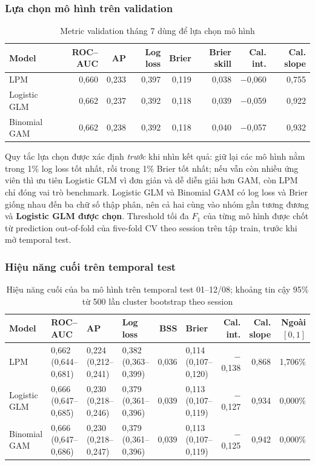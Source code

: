 \subsubsection{Lựa chọn mô hình trên validation}

\begin{table}[H]
\centering
\caption{Metric validation tháng 7 dùng để lựa chọn mô hình}
\label{tab:validation}
\small
\begin{tabular}{lrrrrrrr}
\toprule
\textbf{Model} & \textbf{ROC--AUC} & \textbf{AP} & \textbf{Log loss}
& \textbf{Brier} & \textbf{Brier skill} & \textbf{Cal. int.} & \textbf{Cal. slope} \\
\midrule
LPM          & 0,660 & 0,233 & 0,397 & 0,119 & 0,038 & $-$0,060 & 0,755 \\
Logistic GLM & 0,662 & 0,237 & 0,392 & 0,118 & 0,039 & $-$0,059 & 0,922 \\
Binomial GAM & 0,662 & 0,238 & 0,392 & 0,118 & 0,040 & $-$0,057 & 0,932 \\
\bottomrule
\end{tabular}
\end{table}

Quy tắc lựa chọn được xác định \emph{trước} khi nhìn kết quả: giữ lại các mô hình
nằm trong 1\% log loss tốt nhất, rồi trong 1\% Brier tốt nhất; nếu vẫn còn nhiều
ứng viên thì ưu tiên Logistic GLM vì đơn giản và dễ diễn giải hơn GAM, còn LPM
chỉ đóng vai trò benchmark. Logistic GLM và Binomial GAM có log loss và Brier
giống nhau đến ba chữ số thập phân, nên cả hai cùng vào nhóm gần tương đương và
\textbf{Logistic GLM được chọn}. Threshold tối đa $F_1$ của từng mô hình được
chốt từ prediction out-of-fold của five-fold CV theo session trên tập train,
trước khi mở temporal test.

\subsubsection{Hiệu năng cuối trên temporal test}

\begin{table}[H]
\centering
\caption{Hiệu năng cuối của ba mô hình trên temporal test 01--12/08; khoảng tin
cậy 95\% từ 500 lần cluster bootstrap theo session}
\label{tab:final-metrics}
\footnotesize
\setlength{\tabcolsep}{4pt}
\begin{tabular}{llllrlrrr}
\toprule
\textbf{Model} & \textbf{ROC--AUC} & \textbf{AP} & \textbf{Log loss}
& \textbf{BSS} & \textbf{Brier} & \textbf{Cal. int.} & \textbf{Cal. slope}
& \textbf{Ngoài $[0,1]$} \\
\midrule
LPM          & 0,662 (0,644--0,681) & 0,224 (0,212--0,241) & 0,382 (0,363--0,399) & 0,036 & 0,114 (0,107--0,120) & $-$0,138 & 0,868 & 1,706\% \\
Logistic GLM & 0,666 (0,647--0,685) & 0,230 (0,218--0,246) & 0,379 (0,361--0,396) & 0,039 & 0,113 (0,107--0,119) & $-$0,127 & 0,934 & 0,000\% \\
Binomial GAM & 0,666 (0,647--0,686) & 0,230 (0,218--0,247) & 0,379 (0,361--0,396) & 0,039 & 0,113 (0,107--0,119) & $-$0,125 & 0,942 & 0,000\% \\
\bottomrule
\end{tabular}
\end{table}

